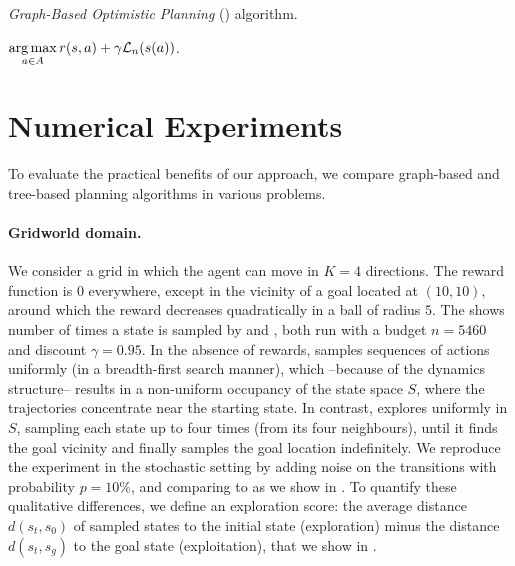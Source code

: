 \documentclass[runningheads]{llncs}
\begin{document}
\begin{algorithm}[ht]
	\caption{\emph{Graph-Based Optimistic Planning} (\GBOP) algorithm.}
	\label{alg:gbop}
	\DontPrintSemicolon
	\Return $\displaystyle\operatorname*{arg\,max}_{a\in A} r(s,a) + \gamma \mathcal{L}_n(s(a))$. 
\end{algorithm}

\section{Numerical Experiments}
\label{sec:experiments}

To evaluate the practical benefits of our approach, we compare graph-based and tree-based planning algorithms in various problems.

\paragraph{Gridworld domain.}
We consider a grid in which the agent can move in $K=4$ directions. The reward function is $0$ everywhere, except in the vicinity of a goal located at $(10, 10)$, around which the reward decreases quadratically in a ball of radius $5$. %
The  shows number of times a state is sampled by \OPD and \GBOPD, both run with a budget $n = 5460$ and discount $\gamma=0.95$. In the absence of rewards, \OPD samples sequences of actions uniformly (in a breadth-first search manner), which --because of the dynamics structure-- results in a non-uniform occupancy of the state space $S$, where the trajectories concentrate near the starting state. In contrast, \GBOPD explores uniformly in $S$, sampling each state up to four times (from its four  neighbours), until it finds the goal vicinity and finally samples the goal location indefinitely. We reproduce the experiment in the stochastic setting by adding noise on the transitions with probability $p=10\%$, and comparing \GBOP to \MDPGapE as we show in . To quantify these qualitative differences, we define an exploration score: the average distance $d(s_t, s_0)$ of sampled states to the initial state (exploration) minus the distance $d(s_t, s_g)$ to the goal state (exploitation), that we show in .
\end{document}

